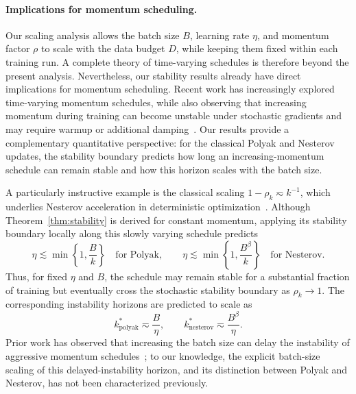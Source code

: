 \documentclass[11pt]{article}
\newcommand{\polyak}{\mathrm{polyak}}
\newcommand{\nesterov}{\mathrm{nesterov}}
\begin{document}
\paragraph{Implications for momentum scheduling.}
Our scaling analysis allows the batch size \(B\), learning rate \(\eta\), and momentum factor \(\rho\) to scale with the data budget \(D\), while keeping them fixed within each training run. A complete theory of time-varying schedules is therefore beyond the present analysis. Nevertheless, our stability results already have direct implications for momentum scheduling. Recent work has increasingly explored time-varying momentum schedules, while also observing that increasing momentum during training can become unstable under stochastic gradients and may require warmup or additional damping~\citep{pagliardini2025ademamix,yarotsky2025sgd,yarotsky2026corner,ferbach2026logarithmic}. Our results provide a complementary quantitative perspective: for the classical Polyak and Nesterov updates, the stability boundary predicts how long an increasing-momentum schedule can remain stable and how this horizon scales with the batch size.

A particularly instructive example is the classical scaling \(1-\rho_k\eqsim k^{-1}\), which underlies Nesterov acceleration in deterministic optimization~\citep{nesterov1983method}. Although Theorem~\ref{thm:stability} is derived for constant momentum, applying its stability boundary locally along this slowly varying schedule predicts
\begin{equation}\label{eqn: stable-schedule}
\eta\lesssim\min\left\{1,\frac{B}{k}\right\}\quad\text{for Polyak},\qquad \eta\lesssim\min\left\{1,\frac{B^\beta}{k}\right\}\quad\text{for Nesterov}.
\end{equation}
Thus, for fixed \(\eta\) and \(B\), the schedule may remain stable for a substantial fraction of training but eventually cross the stochastic stability boundary as \(\rho_k\to1\). The corresponding instability horizons are predicted to scale as
\[
k_{\polyak}^*\eqsim\frac{B}{\eta},\qquad k_{\nesterov}^*\eqsim\frac{B^\beta}{\eta}.
\]
Prior work has observed that increasing the batch size can delay the instability of aggressive momentum schedules~\citep{yarotsky2025sgd}; to our knowledge, the explicit batch-size scaling of this delayed-instability horizon, and its distinction between  Polyak and Nesterov, has not been characterized previously.
\end{document}
